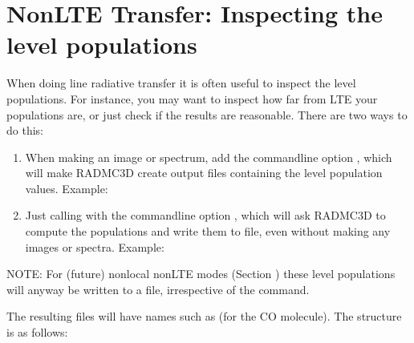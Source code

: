 \documentclass[letterpaper,10pt,english]{sphinxmanual}
\begin{document}
\section{Non\sphinxhyphen{}LTE Transfer: Inspecting the level populations}
\label{\detokenize{lineradtrans:non-lte-transfer-inspecting-the-level-populations}}\label{\detokenize{lineradtrans:sec-nonlte-write-levelpop}}
When doing line radiative transfer it is often useful to inspect the level
populations. For instance, you may want to inspect how far from LTE your
populations are, or just check if the results are reasonable.  There are two
ways to do this:
\begin{enumerate}
%
\item {} 
When making an image or spectrum, add the command\sphinxhyphen{}line option
, which will make RADMC\sphinxhyphen{}3D create output files
containing the level population values. Example:

\begin{sphinxVerbatim}[commandchars=\\\{\}]
    
\end{sphinxVerbatim}

\item {} 
Just calling  with the command\sphinxhyphen{}line
option , which will ask RADMC\sphinxhyphen{}3D to compute the
populations and write them to file, even without making any images
or spectra. Example:

\begin{sphinxVerbatim}[commandchars=\\\{\}]
 
\end{sphinxVerbatim}

\end{enumerate}

NOTE: For (future) non\sphinxhyphen{}local non\sphinxhyphen{}LTE modes (Section {\hyperref[\detokenize{lineradtrans:sec-nonlte-nonlocal}]{}})
these level populations will anyway be written to a file, irrespective of the
 command.

The resulting files will have names such as 
(for the CO molecule). The structure is as follows:
\end{document}
